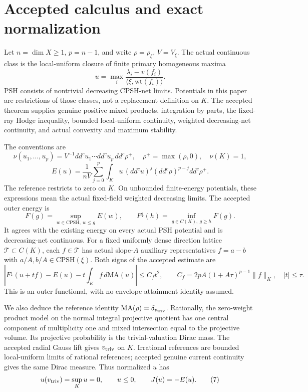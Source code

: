 \documentclass[
  10pt,
]{article}
\begin{document}
\section{Accepted calculus and exact
normalization}\label{accepted-calculus-and-exact-normalization}

Let \(n=\dim X\ge1\), \(p=n-1\), and write \(\rho=\rho_\xi\),
\(V=V_\xi\). The actual continuous class is the local-uniform closure of
finite primary homogeneous maxima
\[u=\max_i\frac{\lambda_i-v(f_i)}{\langle\xi,\mathrm{wt}(f_i)\rangle}.\]
PSH consists of nontrivial decreasing CPSH-net limits. Potentials in
this paper are restrictions of those classes, not a replacement
definition on \(K\). The accepted theorem supplies genuine positive
mixed products, integration by parts, the fixed-ray Hodge inequality,
bounded local-uniform continuity, weighted decreasing-net continuity,
and actual convexity and maximum stability.

The conventions are \[
 \nu(u_1,\ldots,u_p)=V^{-1}dd^cu_1\cdots dd^cu_p\,dd^c\rho^+,
 \quad \rho^+=\max(\rho,0),\quad \nu(K)=1,
 \tag{3}
\] \[
 E(u)=\frac1{nV}\sum_{j=0}^p\int_Ku\,(dd^cu)^j(dd^c\rho)^{p-j}dd^c\rho^+.
 \tag{4}
\] The reference restricts to zero on \(K\). On unbounded finite-energy
potentials, these expressions mean the actual fixed-field weighted
decreasing limits. The accepted outer energy is
\[F(g)=\sup_{w\in\mathrm{CPSH},\ w\le g}E(w),\qquad
 F^\downarrow(h)=\inf_{g\in C(K),\ g\ge h}F(g). \tag{5}\] It agrees with
the existing energy on every actual PSH potential and is decreasing-net
continuous. For a fixed uniformly dense direction lattice
\(\mathcal T\subset C(K)\), each \(f\in\mathcal T\) has actual
slope-\(A\) auxiliary representatives \(f=a-b\) with
\(a/A,b/A\in\mathrm{CPSH}(\xi)\). Both signs of the accepted estimate
are \[
 |F^\downarrow(u+tf)-E(u)-t\int_Kf\,d\mathrm{MA}(u)|
 \le C_f t^2,\qquad C_f=2pA(1+A\tau)^{p-1}\|f\|_K,\quad |t|\le\tau.
 \tag{6}
\] This is an outer functional, with no envelope-attainment identity
assumed.

We also deduce the reference identity
\(\mathrm{MA}(\rho)=\delta_{v_{\rm triv}}\). Rationally, the zero-weight
product model on the normal integral projective quotient has one central
component of multiplicity one and mixed intersection equal to the
projective volume. Its projective probability is the trivial-valuation
Dirac mass. The accepted radial Gauss lift gives \(v_{\rm triv}\) on
\(K\). Irrational references are bounded local-uniform limits of
rational references; accepted genuine current continuity gives the same
Dirac measure. Thus normalized \(u\) has
\[u(v_{\rm triv})=\sup_Ku=0,\qquad u\le0,\qquad J(u)=-E(u). \tag{7}\]
\end{document}
